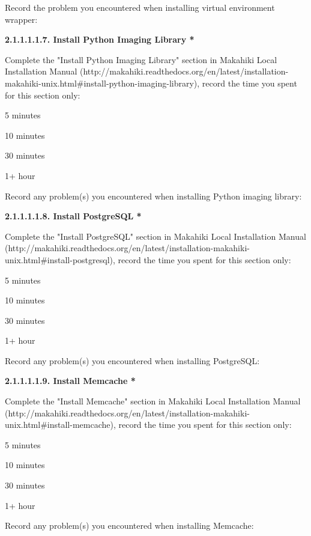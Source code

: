 Record the problem you encountered when installing virtual environment wrapper:

{\bf 2.1.1.1.1.7. Install Python Imaging Library *}

Complete the "Install Python Imaging Library" section in Makahiki Local Installation Manual (http://makahiki.readthedocs.org/en/latest/installation-makahiki-unix.html\#install-python-imaging-library), record the time you spent for this section only:

\begin{compactitem}
\item 5 minutes
\item  10 minutes
\item  30 minutes
\item  1+ hour
\end{compactitem}

Record any problem(s) you encountered when installing Python imaging library:

{\bf 2.1.1.1.1.8. Install PostgreSQL *}

Complete the "Install PostgreSQL" section in Makahiki Local Installation Manual (http://makahiki.readthedocs.org/en/latest/installation-makahiki-unix.html\#install-postgresql), record the time you spent for this section only:

\begin{compactitem}
\item 5 minutes
\item  10 minutes
\item  30 minutes
\item  1+ hour
\end{compactitem}

Record any problem(s) you encountered when installing PostgreSQL:

{\bf 2.1.1.1.1.9. Install Memcache *}

Complete the "Install Memcache" section in Makahiki Local Installation Manual (http://makahiki.readthedocs.org/en/latest/installation-makahiki-unix.html\#install-memcache), record the time you spent for this section only:

\begin{compactitem}
\item 5 minutes
\item  10 minutes
\item  30 minutes
\item  1+ hour
\end{compactitem}

Record any problem(s) you encountered when installing Memcache:

